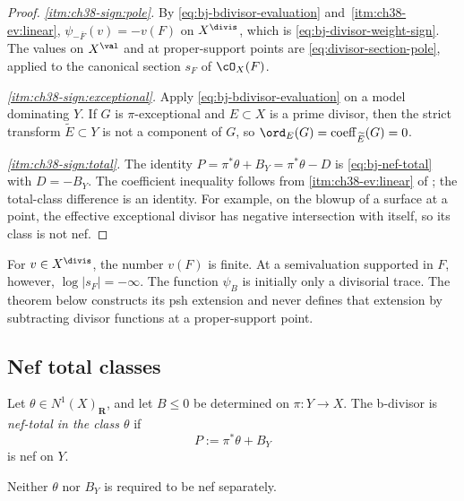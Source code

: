 \begin{proof}
\emph{\cref{itm:ch38-sign:pole}.}  By
\eqref{eq:bj-bdivisor-evaluation} and
\,\cref{itm:ch38-ev:linear},
$\psi_{-\overline F}(v)=-v(F)$ on $X^{\divis}$, which is
\eqref{eq:bj-divisor-weight-sign}.  The values on $X^{\val}$ and at
proper-support points are \eqref{eq:divisor-section-pole}, applied to the
canonical section $s_F$ of $\cO_X(F)$.

\emph{\cref{itm:ch38-sign:exceptional}.}  Apply
\eqref{eq:bj-bdivisor-evaluation} on a model dominating $Y$.  If $G$ is
$\pi$-exceptional and $E\subset X$ is a prime divisor, then the strict
transform $\widetilde E\subset Y$ is not a component of $G$, so
$\ord_E(G)=\operatorname{coeff}_{\widetilde E}(G)=0$.

\emph{\cref{itm:ch38-sign:total}.}  The identity
$P=\pi^*\theta+B_Y=\pi^*\theta-D$ is
\eqref{eq:bj-nef-total} with $D=-B_Y$.  The coefficient inequality follows from
\cref{itm:ch38-ev:linear} of
; the total-class difference
is an identity. For example, on the blowup of a surface at a point,
the effective exceptional divisor has negative intersection with itself,
so its class is not nef.
\end{proof}

\begin{remark}
\label{rem:ch38-trace-analytic-extension}
For $v\in X^{\divis}$, the number $v(F)$ is finite.  At a
semivaluation supported in $F$, however, $\log|s_F|=-\infty$.  The
function $\psi_B$ is initially only a divisorial trace.  The theorem
below constructs its psh extension and never defines that extension by
subtracting divisor functions at a proper-support point.
\end{remark}

\subsection{Nef total classes}
\label{sec:ch38-nef-total}

\begin{definition}
\label{def:bj-nef-total}
Let $\theta\in N^1(X)_{\mathbf R}$, and let $B\le0$ be determined on
$\pi:Y\to X$.  The b-divisor is \emph{nef-total in the class $\theta$}
if
\[
                         P:=\pi^*\theta+B_Y
\tag{38.5}\label{eq:bj-nef-total}
\]
is nef on $Y$.
\end{definition}

Neither $\theta$ nor $B_Y$ is required to be nef separately.


